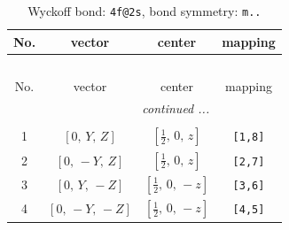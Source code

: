 \documentclass[fleqn,8pt]{jsarticle}
\begin{document}
\renewcommand{\arraystretch}{1.2}
\begin{longtable}{cccc}
\caption{Wyckoff bond: {\tt 4f@2s}, bond symmetry: {\tt m..}}
 \\
 \hline \hline
No. & vector & center & mapping \\ \hline \endfirsthead

\multicolumn{3}{l}{\tablename\ \thetable{}} \\
 \hline \hline
No. & vector & center & mapping \\ \hline \endhead

 \hline \hline
\multicolumn{3}{r}{\footnotesize\it continued ...} \\ \endfoot

 \hline \hline
\multicolumn{3}{r}{} \\ \endlastfoot

1 & $\left[ 0,\, Y,\, Z \right]$ & $\left[ \frac{1}{2},\, 0,\, z \right]$ & {\tt [1,8]} \\ \hline
2 & $\left[ 0,\, - Y,\, Z \right]$ & $\left[ \frac{1}{2},\, 0,\, z \right]$ & {\tt [2,7]} \\ \hline
3 & $\left[ 0,\, Y,\, - Z \right]$ & $\left[ \frac{1}{2},\, 0,\, - z \right]$ & {\tt [3,6]} \\ \hline
4 & $\left[ 0,\, - Y,\, - Z \right]$ & $\left[ \frac{1}{2},\, 0,\, - z \right]$ & {\tt [4,5]} \\
\end{longtable}
\renewcommand{\arraystretch}{1.2}
\end{document}
